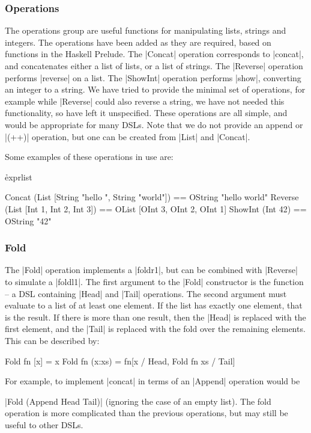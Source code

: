 \documentclass[preprint,draft]{sigplanconf}
\begin{document}
\subsubsection{Operations}

The operations group are useful functions for manipulating lists, strings and integers. The operations have been added as they are required, based on functions in the Haskell Prelude. The |Concat| operation corresponds to |concat|, and concatenates either a list of lists, or a list of strings. The |Reverse| operation performs |reverse| on a list. The |ShowInt| operation performs |show|, converting an integer to a string. We have tried to provide the minimal set of operations, for example while |Reverse| could also reverse a string, we have not needed this functionality, so have left it unspecified. These operations are all simple, and would be appropriate for many DSLs. Note that we do not provide an append or |(++)| operation, but one can be created from |List| and |Concat|.

Some examples of these operations in use are:

\h{exprlist}\begin{code}
Concat (List [String "hello ", String "world"])
    == OString "hello world"
Reverse (List [Int 1, Int 2, Int 3])
    == OList [OInt 3, OInt 2, OInt 1]
ShowInt (Int 42) == OString "42"
\end{code}

\subsubsection{Fold}

The |Fold| operation implements a |foldr1|, but can be combined with |Reverse| to simulate a |foldl1|. The first argument to the |Fold| constructor is the function -- a DSL containing |Head| and |Tail| operations. The second argument must evaluate to a list of at least one element. If the list has exactly one element, that is the result. If there is more than one result, then the |Head| is replaced with the first element, and the |Tail| is replaced with the fold over the remaining elements. This can be described by:

\ignore\begin{code}
Fold fn [x] = x
Fold fn (x:xs) = fn[x / Head, Fold fn xs / Tail]
\end{code}

For example, to implement |concat| in terms of an |Append| operation would be \ignore|Fold (Append Head Tail)| (ignoring the case of an empty list). The fold operation is more complicated than the previous operations, but may still be useful to other DSLs.
\end{document}

